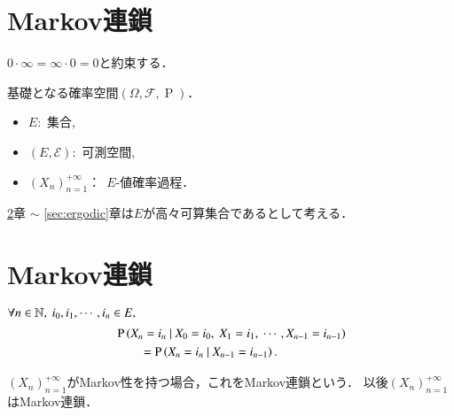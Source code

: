 \section{Markov連鎖}
	\begin{rem}
		$0 \cdot \infty = \infty \cdot 0 = 0$と約束する．
	\end{rem}
	基礎となる確率空間$(\Omega, \mathcal{F}, \operatorname{P})$．
	\begin{itemize}
		\item $E$:\ 集合,
		\item $(E, \mathcal{E})$:\ 可測空間,
		\item $(X_n)_{n=1}^{+\infty}$：\ $E$-値確率過程．
	\end{itemize}
	\begin{rem}
		\ref{sec:first}章 $\sim$ \ref{sec:ergodic}章は$E$が高々可算集合であるとして考える．
	\end{rem}
	
\section{Markov連鎖}
	\label{sec:first}
	\begin{dfn}[Markov性]
		$\forall n \in \mathbb{N},\ i_0, i_1, \cdots,i_n \in E,$
		\begin{align}
			 &\operatorname{P} \left( X_n = i_n \ \middle|\ X_0 = i_0,\ X_1 = i_1,\ \cdots, X_{n-1} = i_{n-1} \right) \\
			 &\qquad= \operatorname{P} \left( X_n = i_n \ \middle|\ X_{n-1} = i_{n-1} \right).
		\end{align}
	\end{dfn}
	$(X_n)_{n=1}^{+\infty}$がMarkov性を持つ場合，これをMarkov連鎖という．
	以後$(X_n)_{n=1}^{+\infty}$はMarkov連鎖．

